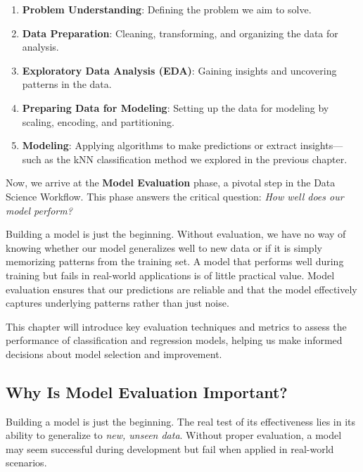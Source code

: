 \documentclass[
]{book}
\providecommand{\tightlist}{%
  \setlength{\itemsep}{0pt}\setlength{\parskip}{0pt}}
\theoremstyle{definition}
\theoremstyle{definition}
\theoremstyle{definition}
\theoremstyle{definition}
\theoremstyle{remark}
\begin{document}
\begin{enumerate}
\def\labelenumi{\arabic{enumi}.}
\tightlist
\item
  \textbf{Problem Understanding}: Defining the problem we aim to solve.\\
\item
  \textbf{Data Preparation}: Cleaning, transforming, and organizing the data for analysis.\\
\item
  \textbf{Exploratory Data Analysis (EDA)}: Gaining insights and uncovering patterns in the data.\\
\item
  \textbf{Preparing Data for Modeling}: Setting up the data for modeling by scaling, encoding, and partitioning.\\
\item
  \textbf{Modeling}: Applying algorithms to make predictions or extract insights---such as the kNN classification method we explored in the previous chapter.
\end{enumerate}

Now, we arrive at the \textbf{Model Evaluation} phase, a pivotal step in the Data Science Workflow. This phase answers the critical question: \emph{How well does our model perform?}

Building a model is just the beginning. Without evaluation, we have no way of knowing whether our model generalizes well to new data or if it is simply memorizing patterns from the training set. A model that performs well during training but fails in real-world applications is of little practical value. Model evaluation ensures that our predictions are reliable and that the model effectively captures underlying patterns rather than just noise.

This chapter will introduce key evaluation techniques and metrics to assess the performance of classification and regression models, helping us make informed decisions about model selection and improvement.

\subsection*{Why Is Model Evaluation Important?}\label{why-is-model-evaluation-important}

Building a model is just the beginning. The real test of its effectiveness lies in its ability to generalize to \emph{new, unseen data}. Without proper evaluation, a model may seem successful during development but fail when applied in real-world scenarios.
\end{document}
